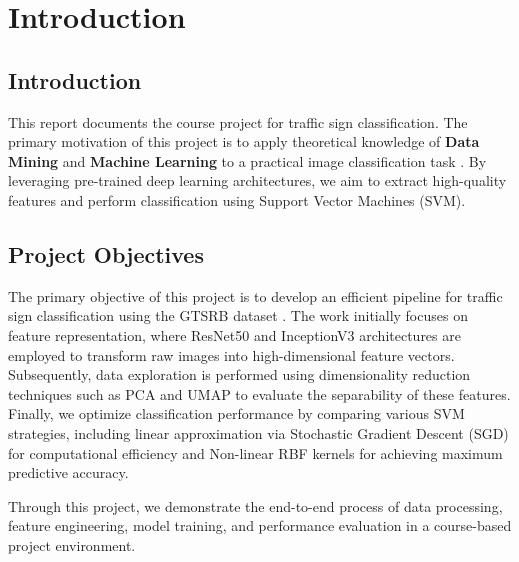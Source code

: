 \chapter{Introduction}

\section{Introduction}
This report documents the course project for traffic sign classification. The primary motivation of this project is to apply theoretical knowledge of \textbf{Data Mining} and \textbf{Machine Learning} to a practical image classification task \cite{svm}. By leveraging pre-trained deep learning architectures, we aim to extract high-quality features and perform classification using Support Vector Machines (SVM).

\section{Project Objectives}
The primary objective of this project is to develop an efficient pipeline for traffic sign classification using the GTSRB dataset \cite{gtsrb}. The work initially focuses on feature representation, where ResNet50 \cite{resnet} and InceptionV3 \cite{inception} architectures are employed to transform raw images into high-dimensional feature vectors. Subsequently, data exploration is performed using dimensionality reduction techniques such as PCA and UMAP \cite{umap} to evaluate the separability of these features. Finally, we optimize classification performance by comparing various SVM strategies, including linear approximation via Stochastic Gradient Descent (SGD) for computational efficiency and Non-linear RBF kernels for achieving maximum predictive accuracy.

Through this project, we demonstrate the end-to-end process of data processing, feature engineering, model training, and performance evaluation in a course-based project environment.
